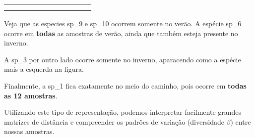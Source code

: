 \documentclass[
]{book}
\begin{document}
\begin{table}
\begin{tabular}{l|r|r|r|r|r|r|r|r|r|r}
\hline
\cellcolor[HTML]{e8867b}{\textcolor{black}{VERAO}} & \cellcolor[HTML]{e8867b}{\textcolor{black}{2}} & \cellcolor[HTML]{e8867b}{\textcolor{black}{0}} & \cellcolor[HTML]{e8867b}{\textcolor{black}{0}} & \cellcolor[HTML]{e8867b}{\textcolor{black}{0}} & \cellcolor[HTML]{e8867b}{\textcolor{black}{6}} & \cellcolor[HTML]{e8867b}{\textcolor{black}{2}} & \cellcolor[HTML]{e8867b}{\textcolor{black}{0}} & \cellcolor[HTML]{e8867b}{\textcolor{black}{0}} & \cellcolor[HTML]{e8867b}{\textcolor{black}{0}} & \cellcolor[HTML]{e8867b}{\textcolor{black}{0}}\\
\hline
\cellcolor[HTML]{e8867b}{\textcolor{black}{VERAO}} & \cellcolor[HTML]{e8867b}{\textcolor{black}{1}} & \cellcolor[HTML]{e8867b}{\textcolor{black}{0}} & \cellcolor[HTML]{e8867b}{\textcolor{black}{0}} & \cellcolor[HTML]{e8867b}{\textcolor{black}{3}} & \cellcolor[HTML]{e8867b}{\textcolor{black}{0}} & \cellcolor[HTML]{e8867b}{\textcolor{black}{2}} & \cellcolor[HTML]{e8867b}{\textcolor{black}{0}} & \cellcolor[HTML]{e8867b}{\textcolor{black}{0}} & \cellcolor[HTML]{e8867b}{\textcolor{black}{1}} & \cellcolor[HTML]{e8867b}{\textcolor{black}{0}}\\
\hline
\cellcolor[HTML]{e8867b}{\textcolor{black}{VERAO}} & \cellcolor[HTML]{e8867b}{\textcolor{black}{1}} & \cellcolor[HTML]{e8867b}{\textcolor{black}{0}} & \cellcolor[HTML]{e8867b}{\textcolor{black}{0}} & \cellcolor[HTML]{e8867b}{\textcolor{black}{0}} & \cellcolor[HTML]{e8867b}{\textcolor{black}{0}} & \cellcolor[HTML]{e8867b}{\textcolor{black}{7}} & \cellcolor[HTML]{e8867b}{\textcolor{black}{0}} & \cellcolor[HTML]{e8867b}{\textcolor{black}{0}} & \cellcolor[HTML]{e8867b}{\textcolor{black}{0}} & \cellcolor[HTML]{e8867b}{\textcolor{black}{1}}\\
\hline
\end{tabular}
\endgroup{}
\end{table}

Veja que as especies sp\_9 e sp\_10 ocorrem somente no verão. A espécie sp\_6 ocorre em \textbf{todas} as amostras de verão, ainda que também esteja presente no inverno.

A sp\_3 por outro lado ocorre somente no inverno, aparacendo como a espécie mais a esquerda na figura.

Finalmente, a sp\_1 fica exatamente no meio do caminho, pois ocorre em \textbf{todas as 12 amostras}.

Utilizando este tipo de representação, podemos interpretar facilmente grandes matrizes de distância e compreender os padrões de variação (diversidade \(\beta\)) entre nossas amostras.
\end{document}
